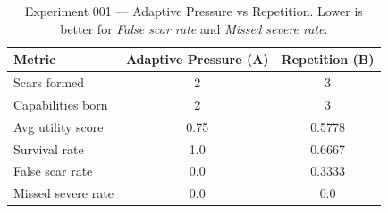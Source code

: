\begin{table}[h]
\centering
\caption{Experiment 001 — Adaptive Pressure vs Repetition. Lower is better for \textit{False scar rate} and \textit{Missed severe rate}.}
\label{tab:exp001}
\begin{tabular}{lcc}
\hline
\textbf{Metric} & \textbf{Adaptive Pressure (A)} & \textbf{Repetition (B)} \\
\hline
Scars formed & 2 & 3 \\
Capabilities born & 2 & 3 \\
Avg utility score & 0.75 & 0.5778 \\
Survival rate & 1.0 & 0.6667 \\
False scar rate & 0.0 & 0.3333 \\
Missed severe rate & 0.0 & 0.0 \\
\hline
\end{tabular}
\end{table}